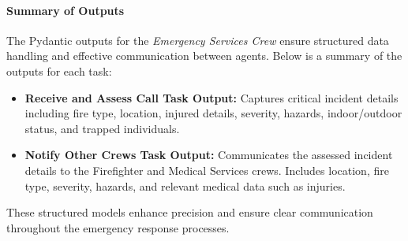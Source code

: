     \paragraph{Summary of Outputs}
    The Pydantic outputs for the \textit{Emergency Services Crew} ensure structured data handling and effective communication between agents. Below is a summary of the outputs for each task:
    
    \begin{itemize}
        \item \textbf{Receive and Assess Call Task Output:} Captures critical incident details including fire type, location, injured details, severity, hazards, indoor/outdoor status, and trapped individuals.
        \item \textbf{Notify Other Crews Task Output:} Communicates the assessed incident details to the Firefighter and Medical Services crews. Includes location, fire type, severity, hazards, and relevant medical data such as injuries.
    \end{itemize}
    
    These structured models enhance precision and ensure clear communication throughout the emergency response processes.
    